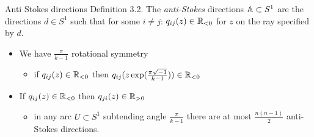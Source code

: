\begin{frame}{Anti Stokes directions}
Definition 3.2. The \emph{anti-Stokes} directions $\mathbb{A}\subset S^1$ are the
directions $d\in S^1$ such that for some $i \neq j$: $q_{ij}(z)\in\mathbb{R}_{<0}$ for
$z$ on the ray specified by $d$.
  \begin{center}
  \end{center}
  \begin{itemize}
    \item We have $\frac{\pi}{k-1}$ rotational symmetry
      \begin{itemize}
        \item if $q_{ij}(z)\in\mathbb{R}_{<0}$ then
          $q_{ij}(z\exp(\frac{\pi\sqrt{-1}}{k-1}))\in\mathbb{R}_{<0}$
      \end{itemize}
    \item If $q_{ij}(z)\in\mathbb{R}_{<0}$ then $q_{ji}(z)\in\mathbb{R}_{>0}$
      \begin{itemize}
        \item in any arc $U \subset S^1$ subtending angle $\frac{\pi}{k − 1}$
          there are at most $\frac{n(n − 1)}{2}$ anti-Stokes directions.
      \end{itemize}
  \end{itemize}
\end{frame}

